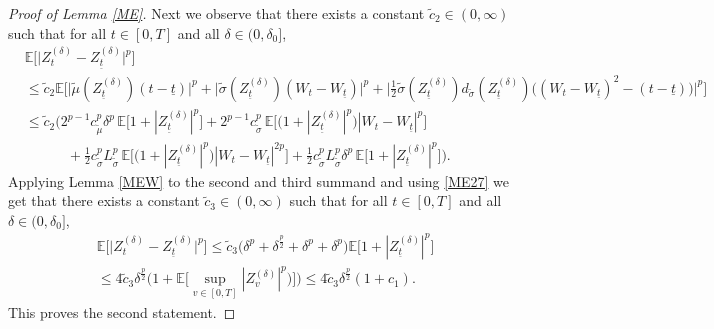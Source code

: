 \documentclass[11pt,a4paper]{article}
\numberwithin{equation}{section}
\theoremstyle{definition}
\newcommand{\E}{{\mathbb{E}}}
\begin{document}
\begin{proof}[Proof of Lemma \ref{ME}]
Next we observe that there exists a constant $\widetilde c_2\in(0,\infty)$ such that for all $t\in[0,T]$ and all $\delta\in(0,\delta_0]$,
\begin{equation}\label{ME28}
    \begin{aligned}
    &\E\big[  \big|Z^{(\delta)}_t- Z^{(\delta)}_{\underline t}\big|^p\big] \\
    &\leq \widetilde c_2 \E\Big[ \big| \widetilde \mu ( Z^{(\delta)}_{\underline t})(t- \underline t)\big|^p + \big|\widetilde\sigma(Z^{(\delta)}_{\underline t}) (W_t-W_{\underline t})\big|^p
    + \Big|\frac{1}{2}\widetilde\sigma(Z^{(\delta)}_{\underline t})d_{\widetilde\sigma}(Z^{(\delta)}_{\underline t}) \big((W_t-W_{\underline t})^2 - (t-\underline t)\big)\Big|^p\Big]\\
    &\leq \widetilde c_2 \Big( 2^{p-1} c_{\widetilde\mu}^p \delta^p\,  \E\big[  1+| Z^{(\delta)}_{\underline t}|^p \big]
    +2^{p-1} c_{\widetilde\sigma}^p\, \E\big[  \big( 1+| Z^{(\delta)}_{\underline t}|^p\big) |W_t-W_{\underline t}|^p\big]\\
    &\quad\quad\quad+\frac{1}{2} c_{\widetilde\sigma}^p L_{\widetilde\sigma}^p\, \E\big[  \big( 1+| Z^{(\delta)}_{\underline t}|^p\big) |W_t-W_{\underline t}|^{2p}\big] 
    +\frac{1}{2} c_{\widetilde\sigma}^p L_{\widetilde\sigma}^p\delta^p\,  \E\big[  1+| Z^{(\delta)}_{\underline t}|^p \big] \Big).
    \end{aligned}
\end{equation}
Applying Lemma \ref{MEW} to the second and third summand and using \eqref{ME27} we get that there exists a constant $\widetilde c_3\in(0,\infty)$ such that for all $t\in[0,T]$ and all $\delta\in(0,\delta_0]$,
\begin{equation}\label{ME29}
    \begin{aligned}
    &\E\big[  \big|Z^{(\delta)}_t- Z^{(\delta)}_{\underline t}\big|^p\big]
    \leq \widetilde c_3\big(\delta^p+ \delta^\frac{p}{2} + \delta^p +\delta^p\big)  \E\big[  1+| Z^{(\delta)}_{\underline t}|^p \big]\\
    &\leq 4 \widetilde c_3 \delta^\frac{p}{2} \Big(  1+ \E\Big[ \sup_{v\in[0,T]} | Z^{(\delta)}_{v}|^p\big) \Big] \Big)
    \leq 4 \widetilde c_3 \delta^\frac{p}{2} (  1+ c_1).
    \end{aligned}
\end{equation}
This proves the second statement. 


\end{proof}
\end{document}
